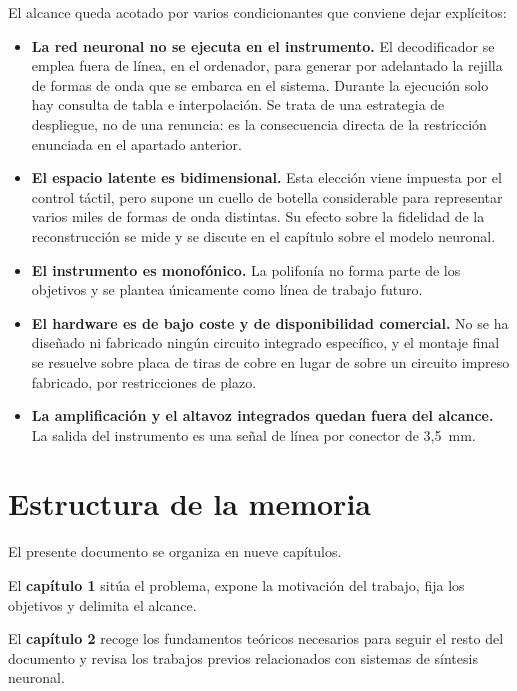 El alcance queda acotado por varios condicionantes que conviene dejar
explícitos:

\begin{itemize}
    \item \textbf{La red neuronal no se ejecuta en el instrumento.} El
          decodificador se emplea fuera de línea, en el ordenador, para generar
          por adelantado la rejilla de formas de onda que se embarca en el
          sistema. Durante la ejecución solo hay consulta de tabla e
          interpolación. Se trata de una estrategia de despliegue, no de una
          renuncia: es la consecuencia directa de la restricción enunciada en el
          apartado anterior.
    \item \textbf{El espacio latente es bidimensional.} Esta elección viene
          impuesta por el control táctil, pero supone un cuello de botella
          considerable para representar varios miles de formas de onda
          distintas. Su efecto sobre la fidelidad de la reconstrucción se mide y
          se discute en el capítulo sobre el modelo neuronal.
    \item \textbf{El instrumento es monofónico.} La polifonía no forma parte de
          los objetivos y se plantea únicamente como línea de trabajo futuro.
    \item \textbf{El hardware es de bajo coste y de disponibilidad comercial.}
          No se ha diseñado ni fabricado ningún circuito integrado específico, y
          el montaje final se resuelve sobre placa de tiras de cobre en lugar de
          sobre un circuito impreso fabricado, por restricciones de plazo.
    \item \textbf{La amplificación y el altavoz integrados quedan fuera del
          alcance.} La salida del instrumento es una señal de línea por conector
          de 3,5~mm. 
\end{itemize}

\section{Estructura de la memoria}

El presente documento se organiza en nueve capítulos.

El \textbf{capítulo 1} sitúa el problema, expone la motivación del trabajo, fija
los objetivos y delimita el alcance.

El \textbf{capítulo 2} recoge los fundamentos teóricos necesarios para seguir el
resto del documento y revisa los trabajos previos relacionados con
sistemas de síntesis neuronal.


